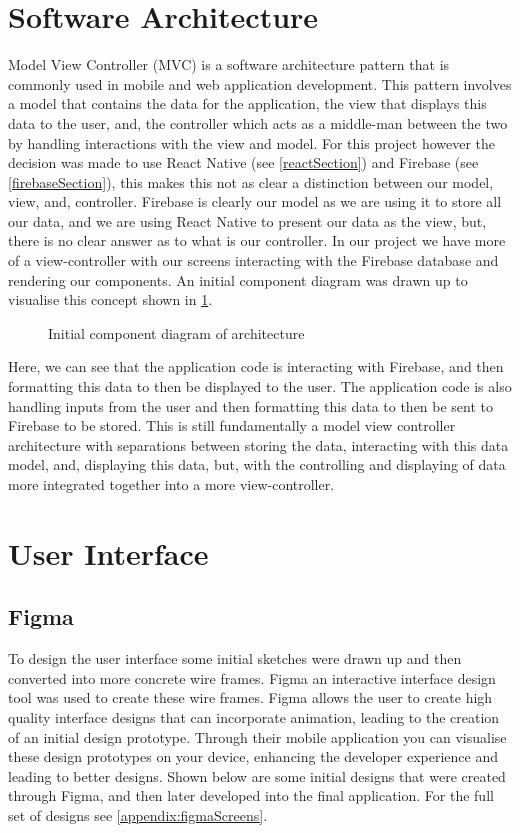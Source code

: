 \section{Software Architecture}
Model View Controller (MVC) \cite{mvc} is a software architecture pattern that is commonly used in mobile and web application development. This pattern involves a model that contains the data for the application, the view that displays this data to the user, and, the controller which acts as a middle-man between the two by handling interactions with the view and model. For this project however the decision was made to use React Native (see \ref{reactSection}) and Firebase (see \ref{firebaseSection}), this makes this not  as clear a distinction between our model, view, and, controller. Firebase is clearly our model as we are using it to store all our data, and we are using React Native to present our data as the view, but, there is no clear answer as to what is our controller. In our project we have more of a view-controller with our screens interacting with the Firebase database and rendering our components. An initial component diagram was drawn up to visualise this concept shown in \ref{fig:compDiag}.
\begin{figure}[!htbp]
    \centering
    \begin{subfigure}[b]{0.6\textwidth}
    \end{subfigure}
    \caption{Initial component diagram of architecture} 
    \label{fig:compDiag}
\end{figure}
\FloatBarrier
Here, we can see that the application code is interacting with Firebase, and then formatting this data to then be displayed to the user. The application code is also handling inputs from the user and then formatting this data to then be sent to Firebase to be stored. This is still fundamentally a model view controller architecture with separations between storing the data, interacting with this data model, and, displaying this data, but, with the controlling and displaying of data more integrated together into a more view-controller.

\section{User Interface}
\subsection*{Figma}
To design the user interface some initial sketches were drawn up and then converted into more concrete wire frames. Figma \cite{figma} an interactive interface design tool was used to create these wire frames. Figma allows the user to create high quality interface designs that can incorporate animation, leading to the creation of an initial design prototype. Through their mobile application you can visualise these design prototypes on your device, enhancing the developer experience and leading to better designs. Shown below are some initial designs that were created through Figma, and then later developed into the final application. For the full set of designs see \ref{appendix:figmaScreens}.

